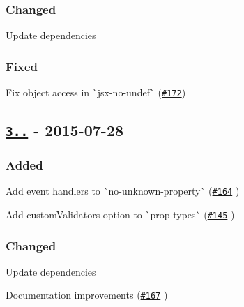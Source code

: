 \subsubsection*{Changed}


\begin{DoxyItemize}
\item Update dependencies
\end{DoxyItemize}

\subsubsection*{Fixed}


\begin{DoxyItemize}
\item Fix object access in \`{}jsx-\/no-\/undef\`{} (\href{https://github.com/yannickcr/eslint-plugin-react/issues/172}{\tt \#172})
\end{DoxyItemize}

\subsection*{\href{https://github.com/yannickcr/eslint-plugin-react/compare/v3.0.0...v3.1.0}{\tt 3..} -\/ 2015-\/07-\/28}

\subsubsection*{Added}


\begin{DoxyItemize}
\item Add event handlers to \`{}no-\/unknown-\/property\`{} (\href{https://github.com/yannickcr/eslint-plugin-react/pull/164}{\tt \#164} )
\item Add custom\+Validators option to \`{}prop-\/types\`{} (\href{https://github.com/yannickcr/eslint-plugin-react/issues/145}{\tt \#145} )
\end{DoxyItemize}

\subsubsection*{Changed}


\begin{DoxyItemize}
\item Update dependencies
\item Documentation improvements (\href{https://github.com/yannickcr/eslint-plugin-react/pull/167}{\tt \#167} )
\end{DoxyItemize}

